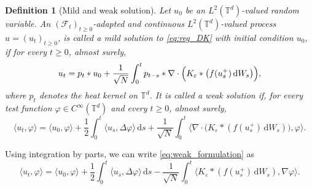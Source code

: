 \documentclass[a4paper,12pt]{article}
\newtheorem{definition}[theorem]{Definition}
\begin{document}
\begin{definition}[Mild and weak solution]\label{def:weak_sol}
Let $u_0$ be an $L^2(\mathbb T^d)$-valued random variable.
An $(\mathcal F_t)_{t\geq 0}$-adapted and continuous $L^2(\mathbb T^d)$-valued process
$u=(u_t)_{t\geq 0}$, is called a mild solution to \eqref{eq:reg_DK} with initial condition $u_0$, if for every $t\geq 0$, almost surely,
\begin{equation}\label{eq:mild_formulation}
    u_t
    =
    p_t * u_0
    +
    \frac{1}{\sqrt N}\int_0^t
    p_{t-s} * \nabla\cdot\Bigl(K_\varepsilon * \bigl(f(u_s^+)\,\mathrm{d}W_s\bigr)\Bigr),
\end{equation}
where $p_t$ denotes the heat kernel on $\mathbb T^d$. It is called a weak solution if, 
for every test function
$\varphi\in C^\infty(\mathbb T^d)$  and every $t\geq 0$, almost surely,
\begin{equation}\label{eq:weak_formulation}
    \langle u_t,\varphi\rangle
    =
    \langle u_0,\varphi\rangle
    +
    \frac12 \int_0^t \langle u_s,\Delta\varphi\rangle\,\mathrm{d}s
    +
    \frac{1}{\sqrt N}\int_0^t
    \big\langle \nabla\cdot\bigl(K_\varepsilon * (f(u_s^+)\,\mathrm{d}W_s)\bigr),\varphi\big\rangle.
\end{equation}
\end{definition}

Using integration by parts, we can write \eqref{eq:weak_formulation} as 
\begin{equation}\label{eq:weak_formulation_ibp}
    \langle u_t,\varphi\rangle
    =
    \langle u_0,\varphi\rangle
    +
    \frac12 \int_0^t \langle u_s,\Delta\varphi\rangle\,\mathrm{d}s
    -
    \frac{1}{\sqrt N}\int_0^t
    \big\langle K_\varepsilon * (f(u_s^+)\,\mathrm{d}W_s),\nabla\varphi\big\rangle.
\end{equation}
\end{document}

